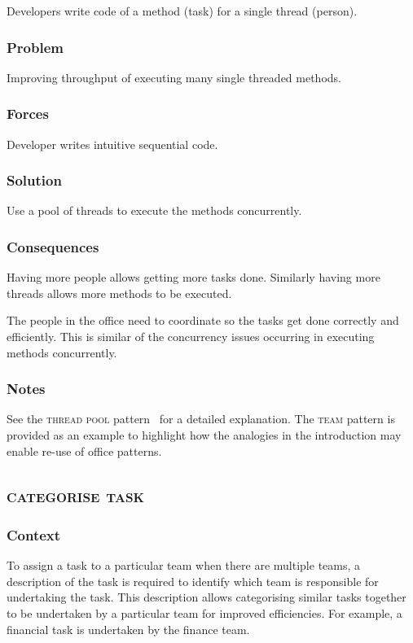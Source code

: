 \documentclass[prodmode]{style/acmlarge}
\begin{document}
Developers write code of a method (task) for a single thread (person).

\subsubsection*{Problem} Improving throughput of executing many single threaded methods.

\subsubsection*{Forces} Developer writes intuitive sequential code.

\subsubsection*{Solution} Use a pool of threads to execute the methods
concurrently.

\subsubsection*{Consequences} Having more people allows getting more tasks done.
Similarly having more threads allows more methods to be executed.

The people in the office need to coordinate so the tasks get done correctly and
efficiently.  This is similar of the concurrency issues occurring in executing
methods concurrently.

\subsubsection*{Notes} See the \textsc{thread pool}
pattern~\cite{thread-per-request} for a detailed explanation.  The \textsc{team}
pattern is provided as an example to highlight how the analogies in the
introduction may enable re-use of office patterns.



\subsection{\textsc{\textbf{categorise task}}}

\subsubsection*{Context} To assign a task to a particular team when there are multiple teams, a
description of the task is required to identify which team is responsible for
undertaking the task.  This description allows categorising similar tasks
together to be undertaken by a particular team for improved efficiencies.  For
example, a financial task is undertaken by the finance team.
\end{document}

